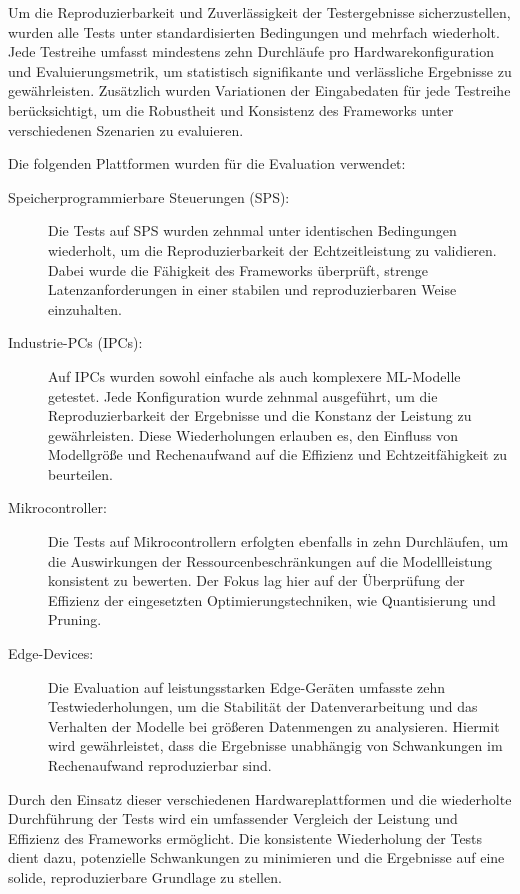 Um die Reproduzierbarkeit und Zuverlässigkeit der Testergebnisse sicherzustellen, wurden alle Tests unter standardisierten Bedingungen und mehrfach wiederholt. Jede Testreihe umfasst mindestens zehn Durchläufe pro Hardwarekonfiguration und Evaluierungsmetrik, um statistisch signifikante und verlässliche Ergebnisse zu gewährleisten. Zusätzlich wurden Variationen der Eingabedaten für jede Testreihe berücksichtigt, um die Robustheit und Konsistenz des Frameworks unter verschiedenen Szenarien zu evaluieren.

Die folgenden Plattformen wurden für die Evaluation verwendet:

\begin{description}
\item[Speicherprogrammierbare Steuerungen (SPS):] Die Tests auf SPS wurden zehnmal unter identischen Bedingungen wiederholt, um die Reproduzierbarkeit der Echtzeitleistung zu validieren. Dabei wurde die Fähigkeit des Frameworks überprüft, strenge Latenzanforderungen in einer stabilen und reproduzierbaren Weise einzuhalten.
\item[] \item[Industrie-PCs (IPCs):] Auf IPCs wurden sowohl einfache als auch komplexere ML-Modelle getestet. Jede Konfiguration wurde zehnmal ausgeführt, um die Reproduzierbarkeit der Ergebnisse und die Konstanz der Leistung zu gewährleisten. Diese Wiederholungen erlauben es, den Einfluss von Modellgröße und Rechenaufwand auf die Effizienz und Echtzeitfähigkeit zu beurteilen.

\item[Mikrocontroller:] Die Tests auf Mikrocontrollern erfolgten ebenfalls in zehn Durchläufen, um die Auswirkungen der Ressourcenbeschränkungen auf die Modellleistung konsistent zu bewerten. Der Fokus lag hier auf der Überprüfung der Effizienz der eingesetzten Optimierungstechniken, wie Quantisierung und Pruning.

\item[Edge-Devices:] Die Evaluation auf leistungsstarken Edge-Geräten umfasste zehn Testwiederholungen, um die Stabilität der Datenverarbeitung und das Verhalten der Modelle bei größeren Datenmengen zu analysieren. Hiermit wird gewährleistet, dass die Ergebnisse unabhängig von Schwankungen im Rechenaufwand reproduzierbar sind.
\end{description}

Durch den Einsatz dieser verschiedenen Hardwareplattformen und die wiederholte Durchführung der Tests wird ein umfassender Vergleich der Leistung und Effizienz des Frameworks ermöglicht. Die konsistente Wiederholung der Tests dient dazu, potenzielle Schwankungen zu minimieren und die Ergebnisse auf eine solide, reproduzierbare Grundlage zu stellen.

